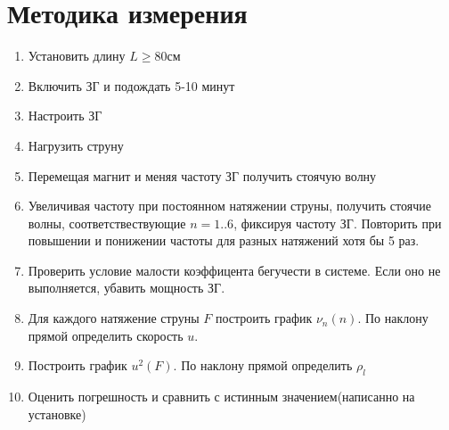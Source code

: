 \section{Методика измерения}
\begin{enumerate}
    \item Установить длину $L\geq80$см
    \item Включить ЗГ и подождать 5-10 минут
    \item Настроить ЗГ
    \item Нагрузить струну
    \item Перемещая магнит и меняя частоту ЗГ получить стоячую волну
    \item Увеличивая частоту при постоянном натяжении струны, получить стоячие волны, соответствествующие $n=1..6$, фиксируя частоту ЗГ. Повторить при повышении и понижении частоты для разных натяжений хотя бы 5 раз.
    \item Проверить условие малости коэффицента бегучести в системе. Если оно не выполняется, убавить мощность ЗГ.
    \item Для каждого натяжение струны $F$ построить график $\nu_n(n)$. По наклону прямой определить скорость $u$.
    \item Построить график $u^2(F)$. По наклону прямой определить $\rho_l$
    \item Оценить погрешность и сравнить с истинным значением(написанно на установке)
\end{enumerate}